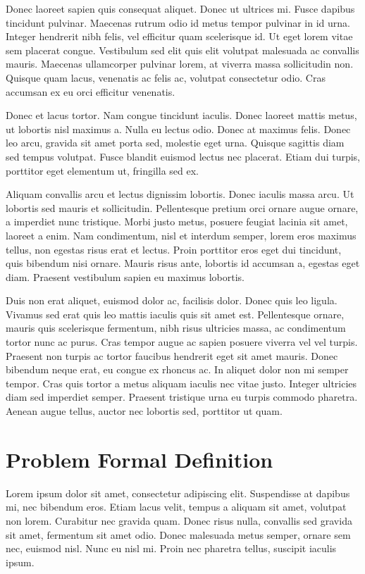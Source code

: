 Donec laoreet sapien quis consequat aliquet. Donec ut ultrices mi. Fusce dapibus tincidunt pulvinar. Maecenas rutrum odio id metus tempor pulvinar in id urna. Integer hendrerit nibh felis, vel efficitur quam scelerisque id. Ut eget lorem vitae sem placerat congue. Vestibulum sed elit quis elit volutpat malesuada ac convallis mauris. Maecenas ullamcorper pulvinar lorem, at viverra massa sollicitudin non. Quisque quam lacus, venenatis ac felis ac, volutpat consectetur odio. Cras accumsan ex eu orci efficitur venenatis.

Donec et lacus tortor. Nam congue tincidunt iaculis. Donec laoreet mattis metus, ut lobortis nisl maximus a. Nulla eu lectus odio. Donec at maximus felis. Donec leo arcu, gravida sit amet porta sed, molestie eget urna. Quisque sagittis diam sed tempus volutpat. Fusce blandit euismod lectus nec placerat. Etiam dui turpis, porttitor eget elementum ut, fringilla sed ex.

Aliquam convallis arcu et lectus dignissim lobortis. Donec iaculis massa arcu. Ut lobortis sed mauris et sollicitudin. Pellentesque pretium orci ornare augue ornare, a imperdiet nunc tristique. Morbi justo metus, posuere feugiat lacinia sit amet, laoreet a enim. Nam condimentum, nisl et interdum semper, lorem eros maximus tellus, non egestas risus erat et lectus. Proin porttitor eros eget dui tincidunt, quis bibendum nisi ornare. Mauris risus ante, lobortis id accumsan a, egestas eget diam. Praesent vestibulum sapien eu maximus lobortis.

Duis non erat aliquet, euismod dolor ac, facilisis dolor. Donec quis leo ligula. Vivamus sed erat quis leo mattis iaculis quis sit amet est. Pellentesque ornare, mauris quis scelerisque fermentum, nibh risus ultricies massa, ac condimentum tortor nunc ac purus. Cras tempor augue ac sapien posuere viverra vel vel turpis. Praesent non turpis ac tortor faucibus hendrerit eget sit amet mauris. Donec bibendum neque erat, eu congue ex rhoncus ac. In aliquet dolor non mi semper tempor. Cras quis tortor a metus aliquam iaculis nec vitae justo. Integer ultricies diam sed imperdiet semper. Praesent tristique urna eu turpis commodo pharetra. Aenean augue tellus, auctor nec lobortis sed, porttitor ut quam.

\section{Problem Formal Definition}
Lorem ipsum dolor sit amet, consectetur adipiscing elit. Suspendisse at dapibus mi, nec bibendum eros. Etiam lacus velit, tempus a aliquam sit amet, volutpat non lorem. Curabitur nec gravida quam. Donec risus nulla, convallis sed gravida sit amet, fermentum sit amet odio. Donec malesuada metus semper, ornare sem nec, euismod nisl. Nunc eu nisl mi. Proin nec pharetra tellus, suscipit iaculis ipsum.

